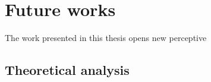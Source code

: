 

\section{Future works}

The work presented in this thesis opens new perceptive 




\subsection{Theoretical analysis}

